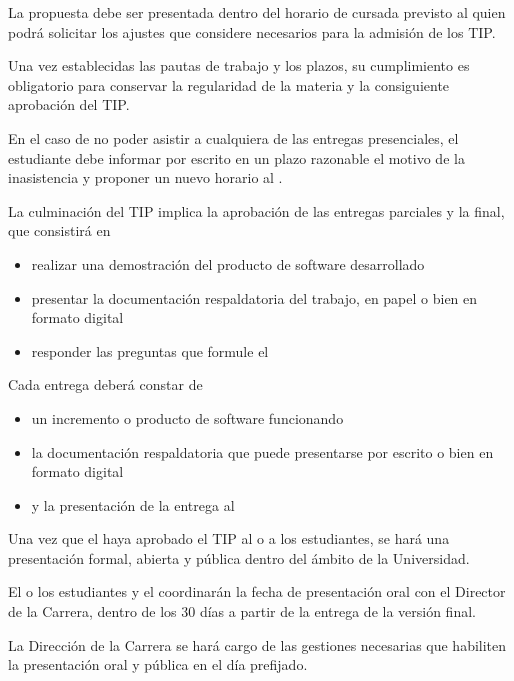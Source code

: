 \articulo La propuesta debe ser presentada dentro del horario de cursada previsto al \profesorTIP{}
quien podrá solicitar los ajustes que considere necesarios para la admisión de los TIP. 



\articulo Una vez establecidas las pautas de trabajo y los plazos, 
su cumplimiento es obligatorio para conservar la regularidad de la materia y la consiguiente
aprobación del TIP.

\articulo En el caso de no poder asistir a cualquiera de las entregas presenciales, el estudiante 
debe informar por escrito en un plazo razonable el motivo de la inasistencia y proponer un nuevo 
horario al \profesorTIP{}.


\articulo La culminación del TIP implica la aprobación de las entregas parciales y la final,
que consistirá en 
\begin{itemize}
 \item realizar una demostración del producto de software desarrollado
 \item presentar la documentación respaldatoria del trabajo, en papel o bien en formato digital
 \item responder las preguntas que formule el \profesorTIP{}
\end{itemize}


\articulo Cada entrega deberá constar de
\begin{itemize}
 \item un incremento o producto de software funcionando
 \item la documentación respaldatoria que puede presentarse por escrito o bien en formato digital
 \item y la presentación de la entrega al \profesorTIP{}
\end{itemize}


\articulo Una vez que el \profesorTIP{} haya aprobado el TIP al o a los estudiantes, 
se hará una presentación formal, abierta y pública dentro del ámbito de la Universidad. 

\articulo El o los estudiantes y el \profesorTIP{}
coordinarán la fecha de presentación oral con el Director de la Carrera, dentro de los 30
días a partir de la entrega de la versión final.

\articulo La Dirección de la Carrera se hará cargo de las gestiones
necesarias que habiliten la presentación oral y pública en el día prefijado.

